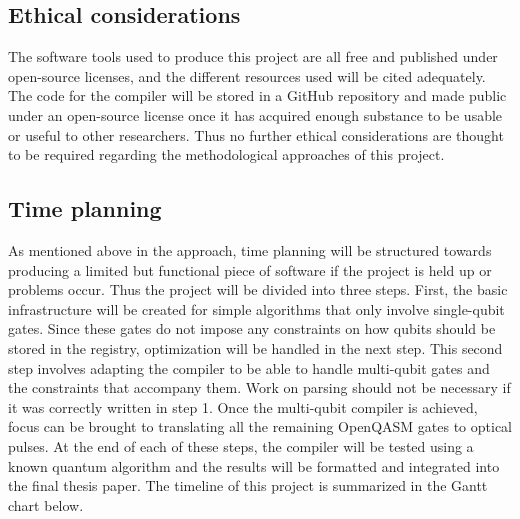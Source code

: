 \subsection{Ethical considerations}
\label{sec:Methodethics}
The software tools used to produce this project are all free and published under open-source licenses, and the different resources used will be cited adequately.
The code for the compiler will be stored in a GitHub repository and made public under an open-source license once it has acquired enough substance to be usable 
or useful to other researchers. Thus no further ethical considerations are thought to be required regarding the methodological approaches of this project.
\subsection{Time planning}
\label{sec:Time}
As mentioned above in the approach, time planning will be structured towards producing a limited but functional piece of software if the project is held
up or problems occur. Thus the project will be divided into three steps. First, the basic infrastructure will be created for simple algorithms that only involve
single-qubit gates. Since these gates do not impose any constraints on how qubits should be stored in the registry, optimization will be handled in the next step.
This second step involves adapting the compiler to be able to handle multi-qubit gates and the constraints that accompany them. Work on parsing should not be necessary 
if it was correctly written in step 1.
Once the multi-qubit compiler is achieved, focus can be brought to translating all the remaining OpenQASM gates to optical pulses. At the end of each of these steps, the
compiler will be tested using a known quantum algorithm and the results will be formatted and integrated into the final thesis paper. The timeline of this project is 
summarized in the Gantt chart below.
